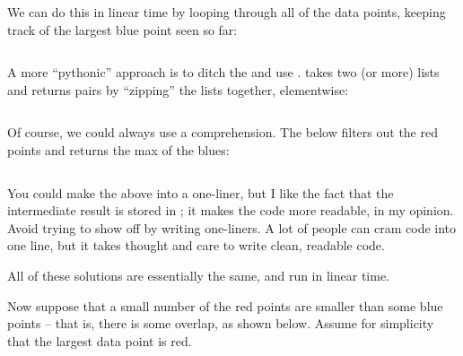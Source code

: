 \begin{progprob}
\begin{subprobset}
\begin{subprob}
\begin{soln}
                We can do this in linear time by looping through all of the
                data points, keeping track of the largest blue point seen
                so far:

                \inputminted{python}{\thisdir/include-solution/pp01a-enum.py}

                A more ``pythonic'' approach is to ditch the 
                and use .  takes two (or more) lists
                and returns pairs by ``zipping'' the lists together, elementwise:

                \inputminted{python}{\thisdir/include-solution/pp01a.py}

                Of course, we could always use a comprehension. The below
                filters out the red points and returns the max of the blues:

                \inputminted{python}{\thisdir/include-solution/pp01a-max.py}

                You could make the above into a one-liner, but I like the
                fact that the intermediate result is stored in ;
                it makes the code more readable, in my opinion. Avoid trying to show
                off by writing one-liners. A lot of people can cram code into
                one line, but it takes thought and care to write clean, readable code.

                All of these solutions are essentially the same, and run in
                linear time.
            \end{soln}

        \end{subprob}
    \end{subprobset}

        Now suppose that a small number of the red points are smaller
        than some blue points -- that is, there is some overlap, as shown
        below. Assume for simplicity that the largest data point is red.

        \begin{center}
\end{center}
\end{progprob}
